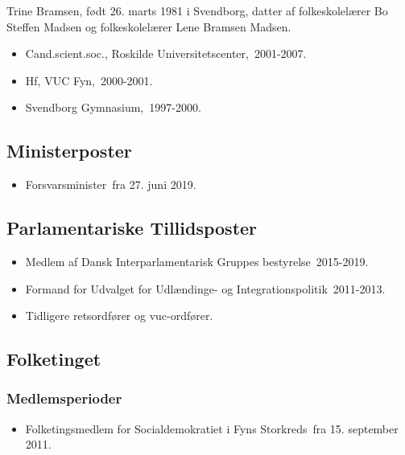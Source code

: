 \documentclass[11pt, a4paper]{awesome-cv}
\begin{document}
\makecvheader[R]
\makelettertitle
\begin{cvletter}
Trine Bramsen, født 26. marts 1981 i Svendborg, datter af folkeskolelærer Bo Steffen Madsen og folkeskolelærer Lene Bramsen Madsen.

\begin{itemize}
\item Cand.scient.soc., Roskilde Universitetscenter, 2001-2007.
\item Hf, VUC Fyn, 2000-2001.
\item Svendborg Gymnasium, 1997-2000.
\end{itemize}
\subsection*{Ministerposter}
\begin{itemize}
\item Forsvarsminister fra 27. juni 2019.
\end{itemize}
\subsection*{Parlamentariske Tillidsposter}
\begin{itemize}
\item Medlem af Dansk Interparlamentarisk Gruppes bestyrelse 2015-2019.
\item Formand for Udvalget for Udlændinge- og Integrationspolitik 2011-2013.
\item Tidligere retsordfører og vuc-ordfører.
\end{itemize}
\subsection*{Folketinget}
\subsubsection*{Medlemsperioder}
\begin{itemize}
\item Folketingsmedlem for Socialdemokratiet i Fyns Storkreds fra 15. september 2011.
\end{itemize}

\end{cvletter}
\end{document}
